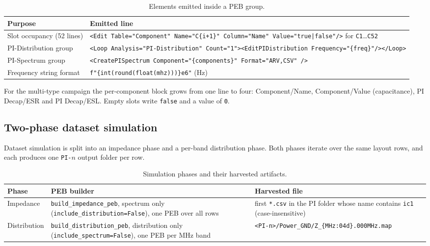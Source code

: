 \begin{table}[htbp]
\centering
\caption{Elements emitted inside a PEB group.}
\label{tab:appA_peb_elements}
\begin{tabular}{p{} p{}}
\hline
Purpose & Emitted line \\
\hline
Slot occupancy (52 lines) &
\texttt{<Edit Table="Component" Name="C\{i+1\}" Column="Name" Value="true|false"/>} for
\texttt{C1}\ldots\texttt{C52} \\
PI-Distribution group &
\texttt{<Loop Analysis="PI-Distribution" Count="1"><EditPIDistribution
Frequency="\{freq\}"/></Loop>} \\
PI-Spectrum group &
\texttt{<CreatePISpectrum Component="\{components\}" Format="ARV,CSV" />} \\
Frequency string format &
\texttt{f"\{int(round(float(mhz)))\}e6"} (Hz) \\
\hline
\end{tabular}
\end{table}

For the multi-type campaign the per-component block grows from one line to four: Component/Name,
Component/Value (capacitance), PI Decap/ESR and PI Decap/ESL. Empty slots write \texttt{false} and
a value of \texttt{0}.

\subsection{Two-phase dataset simulation}
\label{subsec:appA_two_phase}

Dataset simulation is split into an impedance phase and a per-band distribution phase. Both phases
iterate over the same layout rows, and each produces one \texttt{PI-$n$} output folder per row.

\begin{table}[htbp]
\centering
\caption{Simulation phases and their harvested artifacts.}
\label{tab:appA_phases}
\begin{tabular}{p{} p{} p{}}
\hline
Phase & PEB builder & Harvested file \\
\hline
Impedance &
\texttt{build\_impedance\_peb}, spectrum only (\texttt{include\_distribution=False}), one PEB over
all rows &
first \texttt{*.csv} in the PI folder whose name contains \texttt{ic1} (case-insensitive) \\
Distribution &
\texttt{build\_distribution\_peb}, distribution only (\texttt{include\_spectrum=False}), one PEB
per MHz band &
\texttt{<PI-n>/Power\_GND/Z\_\{MHz:04d\}.000MHz.map} \\
\hline
\end{tabular}
\end{table}

